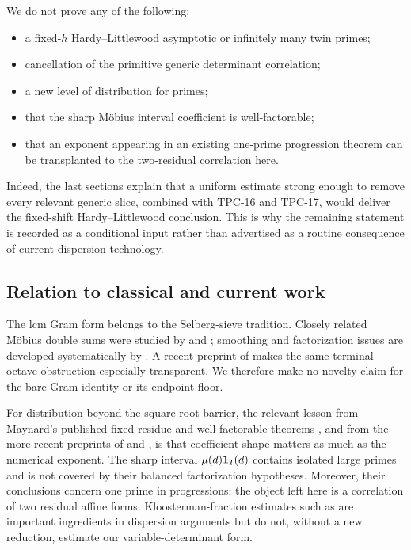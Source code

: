 We do not prove any of the following:

\begin{itemize}
\item a fixed-$h$ Hardy--Littlewood asymptotic or infinitely many twin
primes;
\item cancellation of the primitive generic determinant correlation;
\item a new level of distribution for primes;
\item that the sharp M\"obius interval coefficient is well-factorable;
\item that an exponent appearing in an existing one-prime progression
theorem can be transplanted to the two-residual correlation here.
\end{itemize}

Indeed, the last sections explain that a uniform estimate strong enough
to remove every relevant generic slice, combined with TPC-16 and
TPC-17, would deliver the fixed-shift Hardy--Littlewood conclusion.
This is why the remaining statement is recorded as a conditional input
rather than advertised as a routine consequence of current dispersion
technology.

\subsection{Relation to classical and current work}

The lcm Gram form belongs to the Selberg-sieve tradition.  Closely
related M\"obius double sums were studied by
\citet{DressIwaniecTenenbaum1983} and
\citet{deLaBretecheDressTenenbaum2020}; smoothing and factorization issues
are developed systematically by \citet{GranvilleKoukoulopoulosMaynard2021}.
A recent preprint of \citet{RamareZunigaAlterman2026v3} makes the same
terminal-octave obstruction especially transparent.  We therefore make
no novelty claim for the bare Gram identity or its endpoint floor.

For distribution beyond the square-root barrier, the relevant lesson
from Maynard's published fixed-residue and well-factorable theorems
\citep{Maynard2025I,Maynard2025II}, and from the more recent preprints
of \citet{Lichtman2023} and \citet{Li2026v6}, is that coefficient shape
matters as much as the numerical exponent.  The sharp interval
$\mu(d)\mathbf 1_I(d)$ contains isolated large primes and is not covered by
their balanced factorization hypotheses.  Moreover, their conclusions
concern one prime in progressions; the object left here is a correlation
of two residual affine forms.  Kloosterman-fraction estimates such as
\citet{BettinChandee2018} are important ingredients in dispersion
arguments but do not, without a new reduction, estimate our
variable-determinant form.

